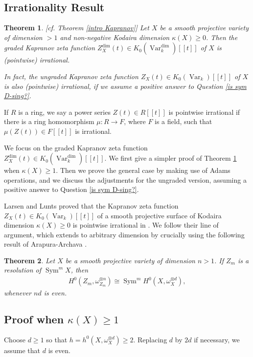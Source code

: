 \documentclass{amsart}
\newtheorem{thm}{Theorem}[section]
\theoremstyle{definition}
\DeclareMathOperator{\Sym}{Sym}
\DeclareMathOperator{\Var}{Var}
\numberwithin{equation}{section}
\begin{document}
\subsection{Irrationality Result}

\begin{thm}\label{irrational}[cf. Theorem \ref{intro Kapranov}]
Let $X$ be a smooth projective variety of dimension $>1$ and non-negative Kodaira dimension $\kappa(X) \geq 0$. Then the graded Kapranov zeta function $Z_X^{\dim}(t) \in K_0(\Var_k^{\dim})[[t]]$ of $X$ is (pointwise) irrational. 

In fact, the ungraded Kapranov zeta function $Z_X(t) \in K_0(\Var_k)[[t]]$ of $X$ is also (pointwise) irrational, if we assume a positive answer to Question \ref{is sym D-sing?}. 
\end{thm}

If $R$ is a ring, we say a power series $Z(t) \in R[[t]]$ is pointwise irrational if there is a ring homomorphism $\mu: R \rightarrow F$, where $F$ is a field, such that $\mu(Z(t)) \in F[[t]]$ is irrational.

We focus on the graded Kapranov zeta function $Z_X^{\dim}(t) \in K_0(\Var_k^{\dim})[[t]]$. We first give a simpler proof of Theorem \ref{irrational} when $\kappa(X) \geq 1$. Then we prove the general case by making use of Adams operations, and we discuss the adjustments for the ungraded version, assuming a positive answer to Question \ref{is sym D-sing?}.

Larsen and Lunts proved that the Kapranov zeta function $Z_X(t) \in K_0(\Var_k)[[t]]$ of a smooth projective surface of Kodaira dimension $\kappa(X) \geq 0$ is pointwise irrational in \cite{larsenluntsrationality}. We follow their line of argument, which extends to arbitrary dimension by crucially using the following result of Arapura-Archava \cite{arapurakodaira}.

\begin{thm}\label{plurigenera}
Let $X$ be a smooth projective variety of dimension $n>1$. If $Z_m$ is a resolution of $\Sym^m X$, then
\begin{align*}
    H^0(Z_m, \omega_{Z_m}^{\otimes n}) \cong \Sym^m H^0(X, \omega_X^{\otimes d}),
\end{align*}
whenever $nd$ is even.
\end{thm}


\subsection{Proof when $\kappa(X) \geq 1$}
Choose $d \geq 1$ so that $h= h^0(X, \omega_X^{\otimes d}) \geq 2$. Replacing $d$ by $2d$ if necessary, we assume that $d$ is even.
\end{document}
